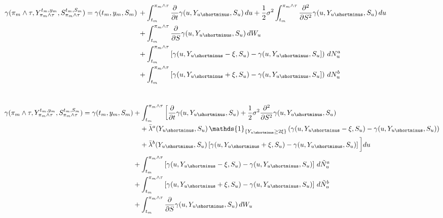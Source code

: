 \documentclass[8pt]{article}
\begin{document}
\\ \\
$\begin{aligned}
\gamma(\pi_m \wedge \tau, Y^{t_m, y_m}_{\pi_m \wedge \tau}, S^{t_m, S_m}_{\pi_m \wedge \tau}) = \gamma(t_m, y_m, S_m) \, & + \int_{t_m}^{\pi_m \wedge \tau} \frac{\partial}{\partial t}\gamma(u, Y_{u\shortminus}, S_u) \, du + \frac{1}{2} \sigma^2 \int_{t_m}^{\pi_m \wedge \tau} \frac{\partial^2}{\partial S^2}\gamma(u, Y_{u\shortminus}, S_u) \, du \, \\
& + \int_{t_m}^{\pi_m \wedge \tau} \frac{\partial}{\partial S}\gamma(u, Y_{u\shortminus}, S_u) \, dW_u \, \\
& + \int_{t_m}^{\pi_m \wedge \tau}\left[\gamma(u, Y_{u\shortminus} - \xi, S_u) -\gamma(u, Y_{u\shortminus}, S_u]\right) \, dN^a_u \, \\
& +\int_{t_m}^{\pi_m \wedge \tau} \left[\gamma(u, Y_{u\shortminus} + \xi, S_u) -\gamma(u, Y_{u\shortminus}, S_u]\right) \, dN^b_u \, \\
\end{aligned}$
\\ \\ \\
$\begin{aligned}
\gamma(\pi_m \wedge \tau, Y^{t_m, y_m}_{\pi_m \wedge \tau}, S^{t_m, S_m}_{\pi_m \wedge \tau}) 
= \gamma(t_m, y_m, S_m) 
&+ \int_{t_m}^{\pi_m \wedge \tau} \bigg[
    \frac{\partial}{\partial t} \gamma(u, Y_{u\shortminus}, S_u) 
    + \frac{1}{2} \sigma^2 \frac{\partial^2}{\partial S^2} \gamma(u, Y_{u\shortminus}, S_u) \\
&\quad + \bar{\lambda}^a(Y_{u\shortminus}, S_u) \, \mathds{1}_{\{Y_{u\shortminus} \ge 2\xi\}} 
    \left(\gamma(u, Y_{u\shortminus} - \xi, S_u) - \gamma(u, Y_{u\shortminus}, S_u)\right) \\
&\quad + \bar{\lambda}^b(Y_{u\shortminus}, S_u) 
    \left[\gamma(u, Y_{u\shortminus} + \xi, S_u) - \gamma(u, Y_{u\shortminus}, S_u)\right]
\bigg] du \\
&+ \int_{t_m}^{\pi_m \wedge \tau} 
    \left[\gamma(u, Y_{u\shortminus} - \xi, S_u) - \gamma(u, Y_{u\shortminus}, S_u)\right] \, d\tilde{N}^a_u \\
&+ \int_{t_m}^{\pi_m \wedge \tau} 
    \left[\gamma(u, Y_{u\shortminus} + \xi, S_u) - \gamma(u, Y_{u\shortminus}, S_u)\right] \, d\tilde{N}^b_u \\
&+ \int_{t_m}^{\pi_m \wedge \tau} 
    \frac{\partial}{\partial S} \gamma(u, Y_{u\shortminus}, S_u) \, dW_u
\end{aligned}$
\\ \\
\end{document}
